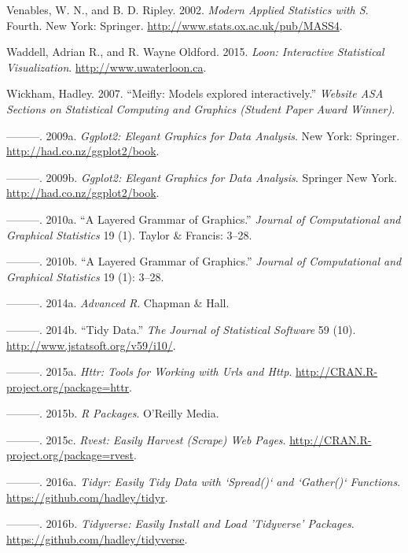 \documentclass[12pt,]{isuthesis}
\begin{document}
\hypertarget{ref-MASS}{}
Venables, W. N., and B. D. Ripley. 2002. \emph{Modern Applied Statistics
with S}. Fourth. New York: Springer.
\url{http://www.stats.ox.ac.uk/pub/MASS4}.

\hypertarget{ref-loon}{}
Waddell, Adrian R., and R. Wayne Oldford. 2015. \emph{Loon: Interactive
Statistical Visualization}. \url{http://www.uwaterloon.ca}.

\hypertarget{ref-Wickham:2007wq}{}
Wickham, Hadley. 2007. ``Meifly: Models explored interactively.''
\emph{Website ASA Sections on Statistical Computing and Graphics
(Student Paper Award Winner)}.

\hypertarget{ref-ggplot2}{}
---------. 2009a. \emph{Ggplot2: Elegant Graphics for Data Analysis}.
New York: Springer. \url{http://had.co.nz/ggplot2/book}.

\hypertarget{ref-ggplot2-book}{}
---------. 2009b. \emph{Ggplot2: Elegant Graphics for Data Analysis}.
Springer New York. \url{http://had.co.nz/ggplot2/book}.

\hypertarget{ref-ggplot2-paper}{}
---------. 2010a. ``A Layered Grammar of Graphics.'' \emph{Journal of
Computational and Graphical Statistics} 19 (1). Taylor \& Francis:
3--28.

\hypertarget{ref-Wickham:2010hya}{}
---------. 2010b. ``A Layered Grammar of Graphics.'' \emph{Journal of
Computational and Graphical Statistics} 19 (1): 3--28.

\hypertarget{ref-adv-r}{}
---------. 2014a. \emph{Advanced R}. Chapman \& Hall.

\hypertarget{ref-tidy-data}{}
---------. 2014b. ``Tidy Data.'' \emph{The Journal of Statistical
Software} 59 (10). \url{http://www.jstatsoft.org/v59/i10/}.

\hypertarget{ref-httr}{}
---------. 2015a. \emph{Httr: Tools for Working with Urls and Http}.
\url{http://CRAN.R-project.org/package=httr}.

\hypertarget{ref-rpkgs}{}
---------. 2015b. \emph{R Packages}. O'Reilly Media.

\hypertarget{ref-rvest}{}
---------. 2015c. \emph{Rvest: Easily Harvest (Scrape) Web Pages}.
\url{http://CRAN.R-project.org/package=rvest}.

\hypertarget{ref-tidyr}{}
---------. 2016a. \emph{Tidyr: Easily Tidy Data with `Spread()` and
`Gather()` Functions}. \url{https://github.com/hadley/tidyr}.

\hypertarget{ref-tidyverse}{}
---------. 2016b. \emph{Tidyverse: Easily Install and Load 'Tidyverse'
Packages}. \url{https://github.com/hadley/tidyverse}.
\end{document}
